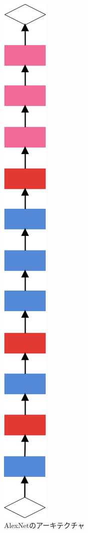 {\begin{figure}[h]
  \centering
  \includegraphics[scale=0.5]{./chap2/fig/alexnet.png}
  \caption{AlexNetのアーキテクチャ}
  \label{fig:alexnet}
\end{figure}

}
